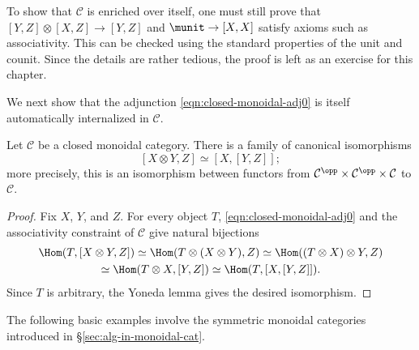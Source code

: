 To show that $\mathcal{C}$ is enriched over itself, one must still prove that
$[Y,Z]\otimes[X,Z]\to[Y,Z]$ and $\munit\to[X,X]$ satisfy axioms such as
associativity. This can be checked using the standard properties of the unit
and counit. Since the details are rather tedious, the proof is left as an
exercise for this chapter.

We next show that the adjunction \eqref{eqn:closed-monoidal-adj0} is itself
automatically internalized in $\mathcal{C}$.

\begin{proposition}\label{prop:closed-monoidal-adj}
	Let $\mathcal{C}$ be a closed monoidal category. There is a family of
	canonical isomorphisms
	\[ [X \otimes Y, Z] \simeq [X, [Y, Z]]; \]
	more precisely, this is an isomorphism between functors from
	$\mathcal{C}^{\opp}\times\mathcal{C}^{\opp}\times\mathcal{C}$ to
	$\mathcal{C}$.
\end{proposition}

\begin{proof}
	Fix $X$, $Y$, and $Z$. For every object $T$,
	\eqref{eqn:closed-monoidal-adj0} and the associativity constraint of
	$\mathcal{C}$ give natural bijections
	\begin{multline*}
		\Hom(T, [X \otimes Y, Z]) \simeq \Hom(T \otimes (X \otimes Y), Z) \simeq \Hom((T \otimes X) \otimes Y, Z) \\
		\simeq \Hom(T \otimes X, [Y, Z]) \simeq \Hom(T, [X, [Y, Z]]).
	\end{multline*}
	Since $T$ is arbitrary, the Yoneda lemma gives the desired isomorphism.
\end{proof}

The following basic examples involve the symmetric monoidal categories
introduced in \S\ref{sec:alg-in-monoidal-cat}.

